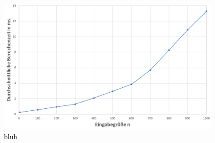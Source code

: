 \documentclass{scrartcl}
\begin{document}
\begin{figure}[htpb]
\centering
\includegraphics[scale=0.24]{../Verwendete/Exp1D_2.png}
\caption{blub}
\label{bla}
\end{figure}
\end{document}
